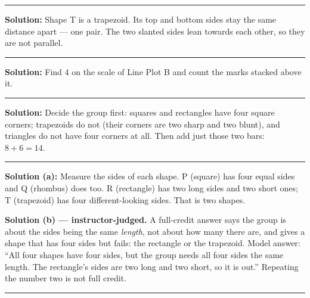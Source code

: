 \documentclass[12pt]{article}
\begin{document}
\vspace{0.12cm}\noindent\rule{\linewidth}{0.2pt}


\textbf{Solution:} Shape T is a trapezoid. Its top and bottom sides stay the same distance apart ---
one pair. The two slanted sides lean towards each other, so they are not parallel. 

\vspace{0.12cm}\noindent\rule{\linewidth}{0.2pt}


\textbf{Solution:} Find $4$ on the scale of Line Plot B and count the marks stacked above it. 

\vspace{0.12cm}\noindent\rule{\linewidth}{0.2pt}


\textbf{Solution:} Decide the group first: squares and rectangles have four square corners;
trapezoids do not (their corners are two sharp and two blunt), and triangles do not have four corners
at all. Then add just those two bars: $8 + 6 = 14$. 

\vspace{0.12cm}\noindent\rule{\linewidth}{0.2pt}


\textbf{Solution (a):} Measure the sides of each shape. P (square) has four equal sides and Q
(rhombus) does too. R (rectangle) has two long sides and two short ones; T (trapezoid) has four
different-looking sides. That is two shapes. 

\textbf{Solution (b) --- instructor-judged.} A full-credit answer says the group is about the sides
being the same \emph{length}, not about how many there are, and gives a shape that has four sides but
fails: the rectangle or the trapezoid. Model answer: ``All four shapes have four sides, but the group
needs all four sides the same length. The rectangle's sides are two long and two short, so it is out.''
Repeating the number two is not full credit.

\vspace{0.12cm}\noindent\rule{\linewidth}{0.2pt}

\end{document}
